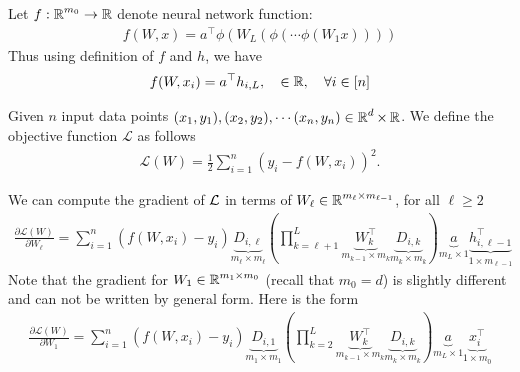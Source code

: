 Let $f : \operatorname{{\mathbb R}}^{m_0} \rightarrow \operatorname{{\mathbb R}}$ denote neural network function: 
\begin{align*}
    f(W,x) = a^\top \phi( W_L ( \phi ( \cdots \phi(W_1 x ) ) ) )
\end{align*}
Thus using definition of $f$ and $h$, we have
\begin{align*}
    f(W,x_i) =  a^\top h_{i,L}, ~~~ \in \operatorname{{\mathbb R}}, ~~~ \forall i \in [n]
\end{align*}

Given $n$ input data points $(x_1 , y_1), (x_2 , y_2) , \cdots (x_n, y_n) \in \operatorname{{\mathbb R}}^{d} \times \operatorname{{\mathbb R}}$. We define the objective function $\mathcal{L}$ as follows
\begin{align*}
\mathcal{L} (W) = \frac{1}{2} \sum_{i=1}^n ( y_i - f (W,x_i) )^2 .
\end{align*}
 

We can compute the gradient of ${\cal L}$ in terms of $W_{\ell} \in \operatorname{{\mathbb R}}^{m_{\ell} \times m_{\ell-1}}$, for all $\ell \geq 2$
\begin{align}\label{eq:gradient}
\frac{\partial\mathcal{L}(W)}{\partial W_{\ell}} = \sum_{i = 1}^{n} ( f(W, x_i) - y_i) \underbrace{D_{i, \ell}}_{ m_{\ell} \times m_{\ell} } \left( \prod_{k = \ell+1}^{L} \underbrace{W_{k}^{\top}}_{m_{k-1} \times m_k}\underbrace{D_{i, k}}_{ m_{k} \times m_k } \right)  \underbrace{a}_{ m_L \times 1} \underbrace{h_{i, \ell -1}^{\top}}_{1 \times m_{\ell-1}}
\end{align}
Note that the gradient for $W_1 \in \operatorname{{\mathbb R}}^{m_1 \times m_0}$ (recall that $m_0 = d$) is slightly different and can not be written by general form. Here is the form
\begin{align}
    \frac{\partial\mathcal{L}(W)}{\partial W_{1}} = \sum_{i = 1}^{n} ( f(W, x_i) - y_i) \underbrace{D_{i, 1}}_{ m_1 \times m_1 } \left( \prod_{k = 2}^{L} \underbrace{W_{k}^{\top}}_{m_{k-1} \times m_k}\underbrace{D_{i, k}}_{ m_{k} \times m_k } \right)  \underbrace{a}_{ m_L \times 1} \underbrace{x_{i}^{\top}}_{1 \times m_{0}}
\end{align}